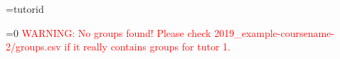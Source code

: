 \documentclass{article}
\def\coursename{example-coursename-2}
\def\semester{2019} %
\def\tutornumber{1}
\newcommand{\columns}{4}
\newcommand{\columnsMO}{3}
\def\tutoridKey{tutorid}
\begin{document}
    \setcounter{allcol}{\columnsMO}

    {\curtutorid=\tutoridKey}
    {
        \xintifEq{\curtutorid}{\tutornumber}%
        {%
            \addtocounter{allcol}{1}
        }{}
    }

    \setcounter{max}{\value{allcol}/\columns}

    \ifnum\value{max}=0
        \setcounter{max}{1}
        \textcolor{red}{
            \hspace{6.0cm}
            WARNING\@: No groups found!\newline
            \hspace*{6.0cm}
            Please check \semester\_\coursename/groups.csv if it really contains groups for tutor
            \tutornumber.
        }
        \vspace{-1.0cm}
    \fi
\end{document}
